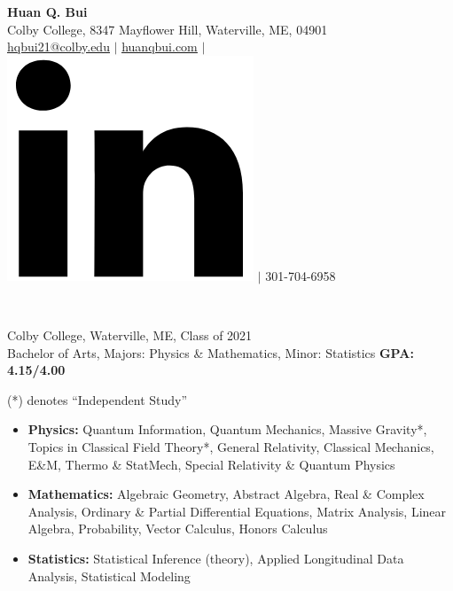 \documentclass[letter, 10pt]{article}
\newcommand{\longunderline}[1]{\uline{#1\hfill\mbox{}}}
\begin{document}
	\begin{center}
		{\Large\textbf{Huan Q. Bui}}\\
		\smallskip
		Colby College, 8347 Mayflower Hill, Waterville, ME, 04901\\ \href{mailto:hqbui21@colby.edu}{\underline{hqbui21@colby.edu}} $\vert$ \href{https://huanqbui.com}{\underline{huanqbui.com}} $\vert$ \href{https://www.linkedin.com/in/huan-bui/}{\includegraphics[scale=0.04]{linkedin_logo.PNG}} $\vert$ 301-704-6958
	\end{center}
	\noindent \longunderline{\normalsize{{}}}\\
	\vspace{-7pt}
	
	
			\noindent Colby College, Waterville, ME, Class of 2021\\
			Bachelor of Arts, {Majors}: Physics \& Mathematics, {Minor}: Statistics \hfill \textbf{GPA: 4.15/4.00}\\
			\vspace{-7pt}

			 (*) denotes ``Independent Study''
			\begin{itemize}[noitemsep, nolistsep]
				\item \textbf{Physics:} Quantum Information, Quantum Mechanics, Massive Gravity*, Topics in Classical Field Theory*,  General Relativity, Classical Mechanics, E\&M, Thermo \& StatMech, Special Relativity \& Quantum Physics
				\item \textbf{Mathematics:} Algebraic Geometry, Abstract Algebra, Real \& Complex Analysis, Ordinary \& Partial Differential Equations, Matrix Analysis, Linear Algebra, Probability, Vector Calculus, Honors Calculus
				\item \textbf{Statistics:} Statistical Inference (theory), Applied Longitudinal Data Analysis, Statistical Modeling\\
			\end{itemize}
 
\end{document}
